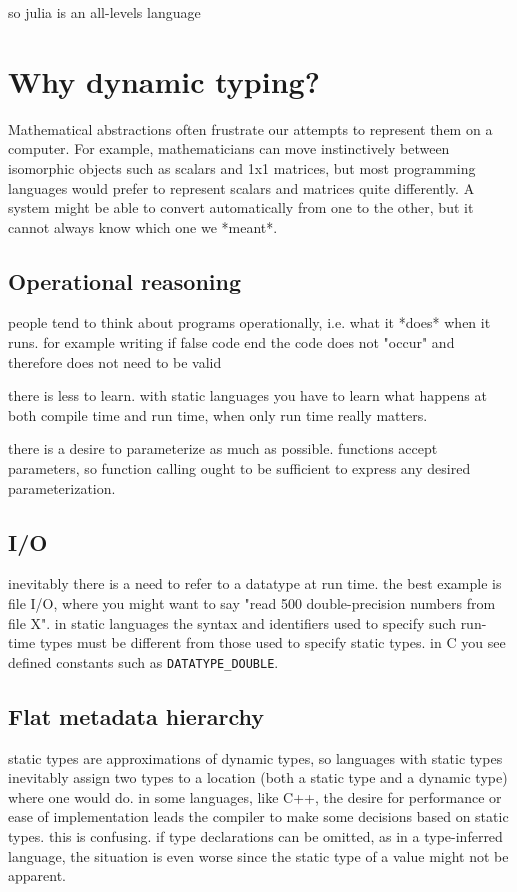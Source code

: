 so julia is an all-levels language


\section{Why dynamic typing?}

Mathematical abstractions often frustrate our attempts to represent them
on a computer. For example, mathematicians can move instinctively between
isomorphic objects such as scalars and 1x1 matrices, but most programming
languages would prefer to represent scalars and matrices quite differently.
A system might be able to convert automatically from one to the other, but
it cannot always know which one we *meant*.


\subsection{Operational reasoning}

people tend to think about programs operationally, i.e. what it *does* when
it runs. for example writing
if false
  code
end
the code does not "occur" and therefore does not need to be valid


there is less to learn. with static languages you have to learn what happens
at both compile time and run time, when only run time really matters.


there is a desire to parameterize as much as possible. functions
accept parameters, so function calling ought to be sufficient to express
any desired parameterization.


\subsection{I/O}

inevitably there is a need to refer to a datatype at run time. the best
example is file I/O, where you might want to say "read 500 double-precision
numbers from file X". in static languages the syntax and identifiers used
to specify such run-time types must be different from those used to specify
static types. in C you see defined constants such as \texttt{DATATYPE\_DOUBLE}.


\subsection{Flat metadata hierarchy}

static types are approximations of dynamic types, so languages with static
types inevitably assign two types to a location (both a static type and a
dynamic type) where one would do. in some languages, like C++, the desire
for performance or ease of implementation leads the compiler to make some
decisions based on static types. this is confusing. if type declarations
can be omitted, as in a type-inferred language, the situation is even worse
since the static type of a value might not be apparent.



